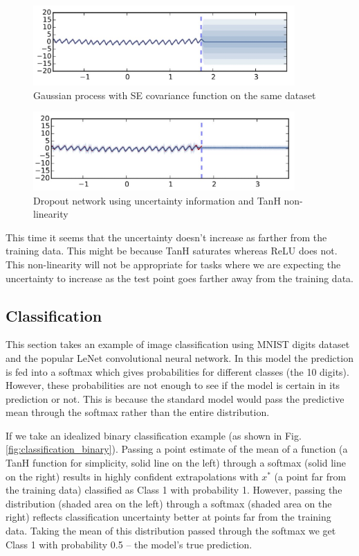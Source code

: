 \begin{figure}[H]
    \centering
    \includegraphics[width=10cm]{labs/12/images/Regression using Gaussian Process.png}
    \caption{Gaussian process with SE covariance function on the same dataset}
    \label{fig:regression_GP}
\end{figure}

\begin{figure}[H]
    \centering
    \includegraphics[width=10cm]{labs/12/images/Regression using TanH.png}
    \caption{Dropout network using uncertainty information and TanH non-linearity}
    \label{fig:regression_tanh}
\end{figure}

This time it seems that the uncertainty doesn't increase as farther from the training data. This might be because TanH saturates whereas ReLU does not. This non-linearity will not be appropriate for tasks where we are expecting the uncertainty to increase as the test point goes farther away from the training data.

\subsection{Classification}
This section takes an example of image classification using MNIST digits dataset and the popular LeNet convolutional neural network. In this model the prediction is fed into a softmax which gives probabilities for different classes (the 10 digits). However, these probabilities are not enough to see if the model is certain in its prediction or not. This is because the standard model would pass the predictive mean through the softmax rather than the entire distribution.

If we take an idealized binary classification example (as shown in Fig. \ref{fig:classification_binary}). Passing a point estimate of the mean of a function (a TanH function for simplicity, solid line on the left) through a softmax (solid line on the right) results in highly confident extrapolations with $x^*$ (a point far from the training data) classified as Class 1 with probability 1. However, passing the distribution (shaded area on the left) through a softmax (shaded area on the right) reflects classification uncertainty better at points far from the training data. Taking the mean of this distribution passed through the softmax we get Class 1 with probability 0.5 -- the model's true prediction.

